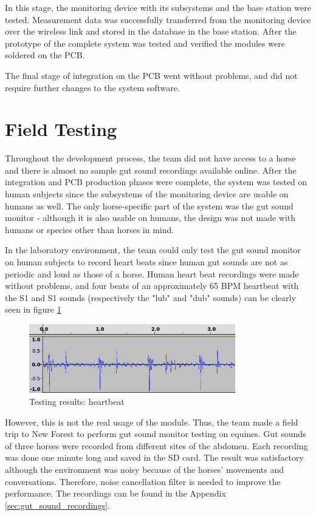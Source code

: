 In this stage, the monitoring device with its subsystems and the base station were tested. Measurement data was successfully transferred from the monitoring device over the wireless link and stored in the database in the base station. After the prototype of the complete system was tested and verified the modules were soldered on the PCB.

The final stage of integration on the PCB went without problems, and did not require further changes to the system software.  



\section{Field Testing}
Throughout the development process, the team did not have access to a horse and there is almost no sample gut sound recordings available online. After the integration and PCB production phases were complete, the system was tested on human subjects since the subsystems of the monitoring device are usable on humans as well. The only horse-specific part of the system was the gut sound monitor - although it is also usable on humans, the design was not made with humans or species other than horses in mind. 

In the laboratory environment, the team could only test the gut sound monitor on human subjects to record heart beats since human gut sounds are not as periodic and loud as those of a horse. Human heart beat recordings were made without problems, and four beats of an approximately 65 BPM heartbeat with the S1 and S1 sounds (respectively the "lub" and "dub" sounds) can be clearly seen in figure \ref{fig:heartbeat}

\begin{figure}
\centering
\includegraphics[width=0.8\textwidth]{Images/heartbeat.png}
\caption{Testing results: heartbeat}
\label{fig:heartbeat}
\end{figure}

However, this is not the real usage of the module. Thus, the team made a field trip to New Forest to perform gut sound monitor testing on equines. Gut sounds of three horses were recorded from different sites of the abdomen. Each recording was done one minute long and saved in the SD card. The result was satisfactory although the environment was noisy because of the horses' movements and conversations. Therefore, noise cancellation filter is needed to improve the performance. The recordings can be found in the Appendix \ref{sec:gut_sound_recordings}.



